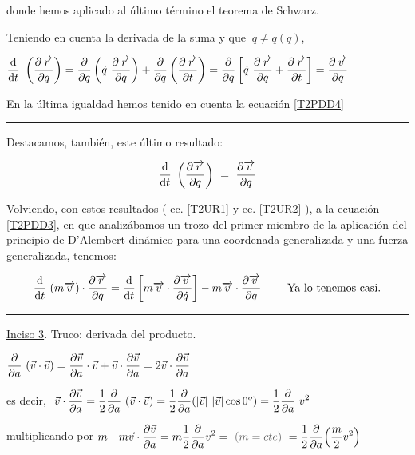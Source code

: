 donde hemos aplicado al último término el teorema de Schwarz.

Teniendo en cuenta la derivada de la suma y que $\ \dot q \neq \dot q(q)$,

$\displaystyle 	\dv{t} \ \left( \pdv{\overrightarrow r}{q}\right) 
= \pdv{q} \left( \dot q \ \pdv{\overrightarrow r}{q} \right) + \pdv{q} \left( \pdv{\overrightarrow r}{t} \right) =
\pdv{q} \left[ 
\dot q \ \pdv{\overrightarrow r}{q} + \pdv{\overrightarrow r}{t} \right]= \pdv{\overrightarrow v}{q} $

En la última igualdad hemos tenido en cuenta la ecuación \ref{T2PDD4}

\begin{flushright}
\rule{200pt}{0.1pt}	
\end{flushright}

\begin{multicols}{2}
Destacamos, también, este último resultado:	

\begin{equation}
\label{T2UR2}
\dv{t} \ \left( \pdv{\overrightarrow r}{q}\right) \ = \ \pdv{\overrightarrow v}{q}
\end{equation}
\end{multicols}

Volviendo, con estos resultados ( ec. \ref{T2UR1} y ec. \ref{T2UR2} ), a la ecuación \ref{T2PDD3}, en que analizábamos un trozo del primer miembro de la aplicación del principio de D'Alembert dinámico para una coordenada generalizada y una fuerza generalizada, tenemos:

\begin{equation}
\label{T2PDD6}
\displaystyle \dv{t} \ (m\overrightarrow v) \cdot \pdv{\overrightarrow r}{q}=
\dv{t} \left[ m\overrightarrow v \cdot \pdv{\overrightarrow v}{\dot q} \right]-
m\overrightarrow v \cdot \pdv{\overrightarrow v}{q}\ \ \ 
\quad \text{ Ya lo tenemos casi.}
\end{equation}

\rule{150pt}{0.1pt}

\underline{Inciso 3}.  Truco: derivada del producto.

$\displaystyle \pdv{a} \ (\vec v \cdot \vec v) = \pdv{\vec v}{a} \cdot \vec v + \vec v \cdot \pdv{\vec v}{a} = 2 \vec v \cdot \pdv{\vec v}{a}$

es decir, $\displaystyle \ \vec v \cdot \pdv{\vec v}{a} = \dfrac 1 2 \pdv{a} \ ( \vec v \cdot \vec v )= \dfrac 1 2 \pdv{a} ( |\vec v|\ |\vec v|\cos 0^o )  = \dfrac 1 2 \pdv{a} \ v^2$


multiplicando por $\displaystyle m\ \ \ m \vec v \cdot \pdv{\vec v}{a} = m \dfrac 1 2 \pdv{a} v^2 = \ \textcolor{gris}{(m=cte)} \ = \dfrac 1 2 \pdv{a} (\dfrac m 2 v^2)$

